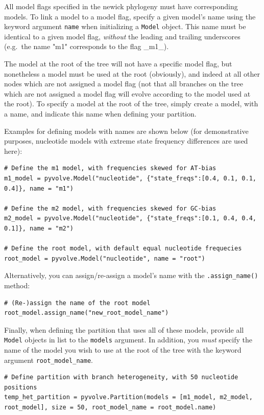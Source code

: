 \documentclass{article}
\newcommand{\code}[1]{\texttt{\small{#1}}}
\begin{document}
All model flags specified in the newick phylogeny must have corresponding models. To link a model to a model flag, specify a given model's name using the keyword argument \code{name} when initializing a \code{Model} object. This name must be identical to a given model flag, \emph{without} the leading and trailing underscores (e.g.\ the name "m1" corresponds to the flag \_m1\_).

The model at the root of the tree will not have a specific model flag, but nonetheless a model must be used at the root (obviously), and indeed at all other nodes which are not assigned a model flag (not that all branches on the tree which are not assigned a model flag will evolve according to the model used at the root). To specify a model at the root of the tree, simply create a model, with a name, and indicate this name when defining your partition.

Examples for defining models with names are shown below (for demonstrative purposes, nucleotide models with extreme state frequency differences are used here):
\begin{lstlisting}
# Define the m1 model, with frequencies skewed for AT-bias
m1_model = pyvolve.Model("nucleotide", {"state_freqs":[0.4, 0.1, 0.1, 0.4]}, name = "m1")

# Define the m2 model, with frequencies skewed for GC-bias
m2_model = pyvolve.Model("nucleotide", {"state_freqs":[0.1, 0.4, 0.4, 0.1]}, name = "m2")

# Define the root model, with default equal nucleotide frequecies
root_model = pyvolve.Model("nucleotide", name = "root")
\end{lstlisting}

Alternatively, you can assign/re-assign a model's name with the \code{.assign\_name()} method:
\begin{lstlisting}
# (Re-)assign the name of the root model
root_model.assign_name("new_root_model_name")
\end{lstlisting}



Finally, when defining the partition that uses all of these models, provide all \code{Model} objects in list to the \code{models} argument. In addition, you \emph{must} specify the name of the model you wish to use at the root of the tree with the keyword argument \code{root\_model\_name}.
\begin{lstlisting}
# Define partition with branch heterogeneity, with 50 nucleotide positions
temp_het_partition = pyvolve.Partition(models = [m1_model, m2_model, root_model], size = 50, root_model_name = root_model.name) 
\end{lstlisting}
\end{document}
